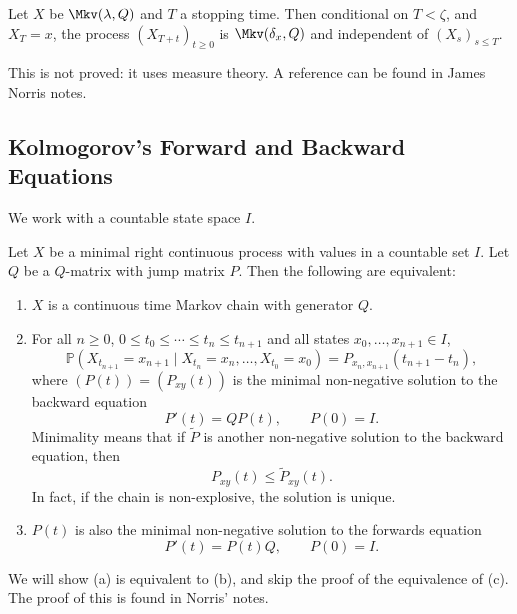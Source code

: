 \documentclass[12pt]{article}
\begin{document}
\begin{theorem}
	Let $X$ be $\Mkv(\lambda, Q)$ and $T$ a stopping time. Then conditional on $T < \zeta$, and $X_T = x$, the process $(X_{T+t})_{t \geq 0}$ is $\Mkv(\delta_x, Q)$ and independent of $(X_s)_{s \leq T}$.
\end{theorem}

This is not proved: it uses measure theory. A reference can be found in James Norris notes.

\subsection{Kolmogorov's Forward and Backward Equations}
\label{sub:kolmogorovs_forward_and_backward_equations}

We work with a countable state space $I$.

\begin{theorem}
	Let $X$ be a minimal right continuous process with values in a countable set $I$. Let $Q$ be a $Q$-matrix with jump matrix $P$. Then the following are equivalent:
	\begin{enumerate}[\normalfont(a)]
		\item $X$ is a continuous time Markov chain with generator $Q$.
		\item For all $n \geq 0$, $0 \leq t_0 \leq \cdots \leq t_n \leq t_{n+1}$ and all states $x_0, \ldots, x_{n+1} \in I$,
			\[
			\mathbb{P}(X_{t_{n+1}} = x_{n+1} \mid X_{t_n} = x_n, \ldots, X_{t_0} = x_0) = P_{x_n,x_{n+1}}(t_{n+1} - t_n)
			,\]
			where $(P(t)) = (P_{xy}(t))$ is the minimal non-negative solution to the backward equation
			\[
			P'(t) = Q P(t), \qquad P(0) = I
			.\]
			Minimality means that if $\tilde P$ is another non-negative solution to the backward equation, then
			\[
			P_{xy}(t) \leq \tilde P_{xy}(t)
			.\]
			In fact, if the chain is non-explosive, the solution is unique.
		\item $P(t)$ is also the minimal non-negative solution to the forwards equation
			\[
			P'(t) = P(t)Q, \qquad P(0) = I
			.\]
	\end{enumerate}
\end{theorem}

We will show (a) is equivalent to (b), and skip the proof of the equivalence of (c). The proof of this is found in Norris' notes.
\end{document}
